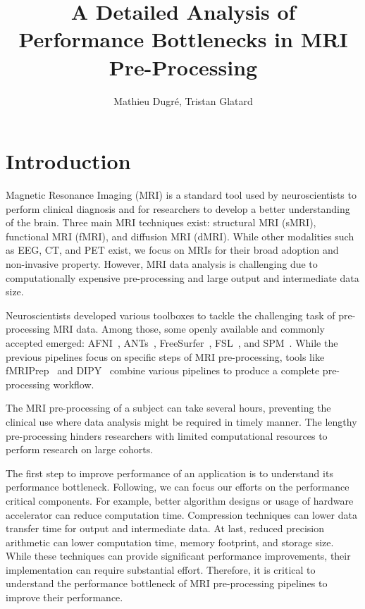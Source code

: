 \documentclass[conference]{IEEEtran}
\title{A Detailed Analysis of Performance Bottlenecks in MRI Pre-Processing}
\author{Mathieu Dugr\'e, Tristan Glatard}
\begin{document}
\maketitle

\begin{abstract}
									
\end{abstract}

\section{Introduction}
Magnetic Resonance Imaging (MRI) is a standard tool used by neuroscientists to perform clinical diagnosis and for researchers to develop a better understanding of the brain. Three main MRI techniques exist: structural MRI (sMRI), functional MRI (fMRI), and diffusion MRI (dMRI). While other modalities such as EEG, CT, and PET exist, we focus on MRIs for their broad adoption and non-invasive property. However, MRI data analysis is challenging due to computationally expensive pre-processing and large output and intermediate data size.

Neuroscientists developed various toolboxes to tackle the challenging task of pre-processing MRI data. Among those, some openly available and commonly accepted emerged: AFNI~\cite{Cox1996-sl}, ANTs~\cite{Avants_undated-fu}, FreeSurfer~\cite{Fischl2012-bp}, FSL~\cite{Jenkinson2012-cq}, and SPM~\cite{Friston2007-ag}. While the previous pipelines focus on specific steps of MRI pre-processing, tools like fMRIPrep~\cite{Esteban2019-og} and DIPY~\cite{Garyfallidis2014-ve} combine various pipelines to produce a complete pre-processing workflow.

The MRI pre-processing of a subject can take several hours, preventing the clinical use where data analysis might be required in timely manner. The lengthy pre-processing hinders researchers with limited computational resources to perform research on large cohorts.

The first step to improve performance of an application is to understand its performance bottleneck. Following, we can focus our efforts on the performance critical components. For example, better algorithm designs or usage of hardware accelerator can reduce computation time. Compression techniques can lower data transfer time for output and intermediate data. At last, reduced precision arithmetic can lower computation time, memory footprint, and storage size. While these techniques can provide significant performance improvements, their implementation can require substantial effort. Therefore, it is critical to understand the performance bottleneck of MRI pre-processing pipelines to improve their performance.
\end{document}
